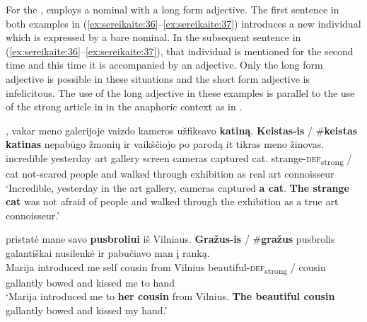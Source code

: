 \documentclass[output=paper,
modfonts
]{langscibook}
\begin{document}
For the ,  employs a nominal with a long form adjective. The first sentence in both examples in (\ref{ex:sereikaite:36}--\ref{ex:sereikaite:37}) introduces a new individual which is expressed by a bare nominal. In the subsequent sentence in (\ref{ex:sereikaite:36}--\ref{ex:sereikaite:37}), that individual is mentioned for the second time and this time it is accompanied by an adjective. Only the long form adjective is possible in these situations and the short form adjective is infelicitous. The use of the long adjective in these examples is parallel to the use of the strong article in  in the anaphoric context as in . 

\begin{exe}
	\ex \label{ex:sereikaite:36}
	, {vakar} {meno} {galerijoje} {vaizdo} {kameros} {užfiksavo} {\textbf{katiną}}. \textbf{Keistas-is} \textnormal{/} \textnormal{\#}\textbf{keistas} {\textbf{katinas}} {nepabūgo} {žmonių} {ir} {vaikščiojo} {po} {parodą} {it} {tikras} {meno} {žinovas}. \\
	incredible yesterday art gallery screen cameras captured {cat}. {strange-\textsc{def}\textsubscript{strong}} /  {cat} not-scared people and walked through exhibition as real art connoisseur\\
	\trans `Incredible, yesterday in the art gallery, cameras captured \textbf{a cat}. \textbf{The strange cat} was not afraid of people and walked through the exhibition as a true art connoisseur.' 
\end{exe}

\begin{exe}
	\ex \label{ex:sereikaite:37}
	 {pristatė} {mane} {savo} {\textbf{pusbroliui}} {iš} {Vilniaus}. \textbf{Gražus-is} \textnormal{/} \textnormal{\#}\textbf{gražus} {pusbrolis} {galantiškai} {nusilenkė} {ir} {pabučiavo} {man} {į} {ranką}.\\
	Marija introduced me self {cousin} from Vilnius {beautiful-\textsc{def}\textsubscript{strong}} /  cousin gallantly bowed and kissed me to hand \\
	\trans `Marija introduced me to \textbf{her cousin} from Vilnius. \textbf{The beautiful cousin} gallantly bowed and kissed my hand.'
\end{exe}
\end{document}
